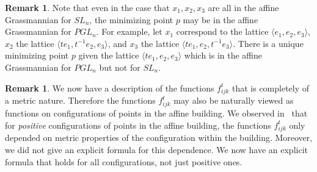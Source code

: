 \documentclass[10pt]{amsart}
\theoremstyle{definition}
\newtheorem{rema}[theorem]{Remark}
\begin{document}
\begin{rema} Note that even in the case that $x_1, x_2, x_3$ are all in the affine Grassmannian for $SL_n$, the minimizing point $p$ may be in the affine Grassmannian for $PGL_n$. For example, let $x_1$ correspond to the lattice $\langle e_1, e_2, e_3\rangle $, $x_2$ the lattice $\langle te_1, t^{-1}e_2, e_3\rangle $, and $x_3$ the lattice $\langle te_1, e_2, t^{-1}e_3\rangle $. There is a unique minimizing point $p$ given the lattice $\langle te_1, e_2, e_3\rangle $ which is in the affine Grassmannian for $PGL_n$ but not for $SL_n$.
\end{rema}

\begin{rema} We now have a description of the functions $f_{ijk}^t$ that is completely of a metric nature. Therefore the functions $f_{ijk}^t$ may also be naturally viewed as functions on configurations of points in the affine building. We observed in~\cite{Le} that for \emph{positive} configurations of points in the affine building, the functions $f_{ijk}^t$ only depended on metric properties of the configuration within the building. Moreover, we did not give an explicit formula for this dependence. We now have an explicit formula that holds for all configurations, not just positive ones.
\end{rema}
\end{document}
